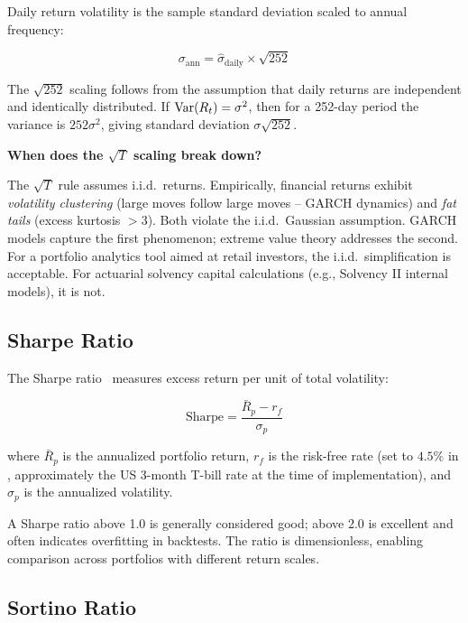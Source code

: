 Daily return volatility is the sample standard deviation scaled to annual frequency:

\begin{equation}
  \sigma_{\text{ann}} = \hat{\sigma}_{\text{daily}} \times \sqrt{252}
  \label{eq:ann-vol}
\end{equation}

The $\sqrt{252}$ scaling follows from the assumption that daily returns are independent and identically distributed. If $\operatorname{Var}(R_t) = \sigma^2$, then for a 252-day period the variance is $252\sigma^2$, giving standard deviation $\sigma\sqrt{252}$.

\begin{challengebox}
  \textbf{When does the $\sqrt{T}$ scaling break down?}

  The $\sqrt{T}$ rule assumes i.i.d.\ returns. Empirically, financial returns exhibit \emph{volatility clustering} (large moves follow large moves -- GARCH dynamics) and \emph{fat tails} (excess kurtosis $> 3$). Both violate the i.i.d.\ Gaussian assumption. GARCH models capture the first phenomenon; extreme value theory addresses the second. For a portfolio analytics tool aimed at retail investors, the i.i.d.\ simplification is acceptable. For actuarial solvency capital calculations (e.g., Solvency II internal models), it is not.
\end{challengebox}

\subsection{Sharpe Ratio}

The Sharpe ratio~\cite{sharpe1966} measures excess return per unit of total volatility:

\begin{equation}
  \text{Sharpe} = \frac{\bar{R}_p - r_f}{\sigma_p}
  \label{eq:sharpe}
\end{equation}

where $\bar{R}_p$ is the annualized portfolio return, $r_f$ is the risk-free rate (set to $4.5\%$ in , approximately the US 3-month T-bill rate at the time of implementation), and $\sigma_p$ is the annualized volatility.

A Sharpe ratio above 1.0 is generally considered good; above 2.0 is excellent and often indicates overfitting in backtests. The ratio is dimensionless, enabling comparison across portfolios with different return scales.

\subsection{Sortino Ratio}

